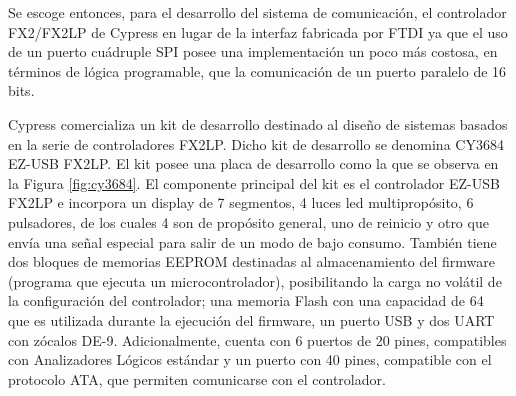 Se escoge entonces, para el desarrollo del sistema de comunicación, el controlador FX2/FX2LP de Cypress en lugar de la interfaz fabricada por FTDI ya que el uso de un puerto cuádruple SPI posee una implementación un poco más costosa, en términos de lógica programable, que la comunicación de un puerto paralelo de 16 bits.

Cypress comercializa un kit de desarrollo destinado al diseño de sistemas basados en la serie de controladores FX2LP. Dicho kit de desarrollo se denomina CY3684 EZ-USB FX2LP. El kit posee una placa de desarrollo como la que se observa en la Figura \ref{fig:cy3684}. El componente principal del kit es el controlador EZ-USB FX2LP e incorpora un display de 7 segmentos, 4 luces led multipropósito, 6 pulsadores, de los cuales 4 son de propósito general, uno de reinicio y otro que envía una señal especial para salir de un modo de bajo consumo. También tiene dos bloques de memorias EEPROM destinadas al almacenamiento del firmware (programa que ejecuta un microcontrolador), posibilitando la carga no volátil de la configuración del controlador; una memoria Flash con una capacidad de \SI{64}{\kilo\byte} que es utilizada durante la ejecución del firmware, un puerto USB y dos UART con zócalos DE-9. Adicionalmente, cuenta con 6 puertos de 20 pines, compatibles con Analizadores Lógicos estándar y un puerto con 40 pines, compatible con el protocolo ATA, que permiten comunicarse con el controlador.
 

